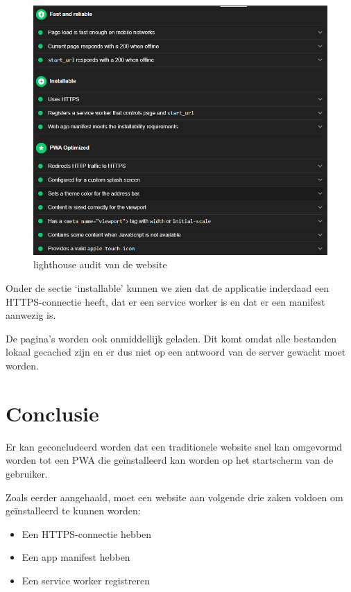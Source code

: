 	\begin{figure}[H]
		\centering
		\includegraphics{./img/lighthouse_dart.png}{}
		\caption{lighthouse audit van de website}
	\end{figure}

	Onder de sectie ‘installable’ kunnen we zien dat de applicatie inderdaad een HTTPS-connectie heeft, dat er een service worker is en dat er een manifest aanwezig is.
	
	De pagina's worden ook onmiddellijk geladen. Dit komt omdat alle bestanden lokaal gecached zijn en er dus niet op een antwoord van de server gewacht moet worden.
	
\section{Conclusie}

	Er kan geconcludeerd worden dat een traditionele website snel kan omgevormd worden tot een PWA die geïnstalleerd kan worden op het startscherm van de gebruiker. 
	
	Zoals eerder aangehaald, moet een website aan volgende drie zaken voldoen om geïnstalleerd te kunnen worden:
	\begin{itemize}
		\item Een HTTPS-connectie hebben
		\item Een app manifest hebben
		\item Een service worker registreren
	\end{itemize}	
	
